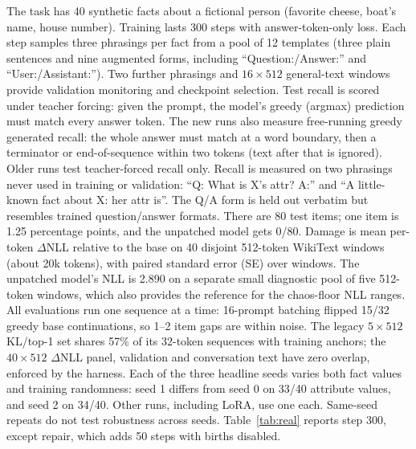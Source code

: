 \documentclass[11pt]{article}
\begin{document}
The task has 40 synthetic facts about a fictional person (favorite cheese, boat's name, house number).
Training lasts 300 steps with answer-token-only loss. Each step samples three phrasings per fact from
a pool of 12 templates (three plain sentences and nine augmented forms, including
``Question:/Answer:'' and ``User:/Assistant:''). Two further phrasings and $16\!\times\!512$ general-text
windows provide validation monitoring and checkpoint selection. Test recall is scored under teacher forcing: given the prompt, the model's greedy (argmax) prediction
must match every answer token. The new runs also measure free-running greedy generated recall:
the whole answer must match at a word boundary, then a terminator or end-of-sequence within
two tokens (text after that is ignored). Older runs test teacher-forced recall only. Recall is measured
on two phrasings never used in training or validation: ``Q: What is X's attr? A:'' and
``A little-known fact about X: her attr is''. The Q/A form is held out verbatim but resembles trained
question/answer formats. There are 80 test items; one item is 1.25 percentage points, and the unpatched
model gets 0/80. Damage is mean per-token $\Delta$NLL relative to the base on 40 disjoint 512-token
WikiText windows (about 20k tokens), with paired standard error (SE) over windows. The unpatched
model's NLL is 2.890 on a separate small diagnostic pool of five 512-token windows,
which also provides the reference for the chaos-floor NLL ranges. All evaluations run one sequence
at a time: 16-prompt batching flipped 15/32 greedy base continuations, so 1--2 item gaps are within noise.
The legacy $5\!\times\!512$ KL/top-1 set shares 57\% of its 32-token sequences with training anchors;
the $40\!\times\!512$ $\Delta$NLL panel, validation and conversation text have zero overlap, enforced by the harness.
Each of the three headline seeds varies both fact values and training randomness: seed 1 differs from seed 0 on
33/40 attribute values, and seed 2 on 34/40. Other runs, including LoRA, use one each. Same-seed repeats
do not test robustness across seeds. Table~\ref{tab:real} reports step 300, except repair,
which adds 50 steps with births disabled.
\end{document}
